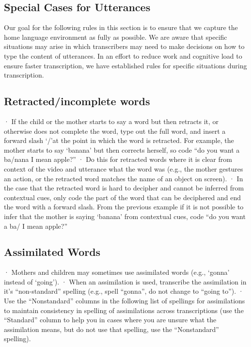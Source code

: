 \documentclass[
  12pt,
]{book}
\begin{document}
\hypertarget{special-cases-for-utterances}{%
\subsection{Special Cases for Utterances}\label{special-cases-for-utterances}}

Our goal for the following rules in this section is to ensure that we capture the home language environment as fully as possible. We are aware that specific situations may arise in which transcribers may need to make decisions on how to type the content of utterances. In an effort to reduce work and cognitive load to ensure faster transcription, we have established rules for specific situations during transcription.

\hypertarget{retractedincomplete-words}{%
\subsection{Retracted/incomplete words}\label{retractedincomplete-words}}

· If the child or the mother starts to say a word but then retracts it, or otherwise does not complete the word, type out the full word, and insert a forward slash `/'at the point in which the word is retracted. For example, the mother starts to say `banana' but then corrects herself, so code ``do you want a ba/nana I mean apple?''
· Do this for retracted words where it is clear from context of the video and utterance what the word was (e.g., the mother gestures an action, or the retracted word matches the name of an object on screen).
· In the case that the retracted word is hard to decipher and cannot be inferred from contextual cues, only code the part of the word that can be deciphered and end the word with a forward slash. From the previous example if it is not possible to infer that the mother is saying `banana' from contextual cues, code ``do you want a ba/ I mean apple?''

\hypertarget{assimilated-words}{%
\subsection{Assimilated Words}\label{assimilated-words}}

· Mothers and children may sometimes use assimilated words (e.g., `gonna' instead of `going').
· When an assimilation is used, transcribe the assimilation in it's ``non-standard'' spelling (e.g., spell ``gonna'', do not change to ``going to'').
· Use the ``Nonstandard'' columns in the following list of spellings for assimilations to maintain consistency in spelling of assimilations across transcriptions (use the ``Standard'' column to help you in cases where you are unsure what the assimilation means, but do not use that spelling, use the ``Nonstandard'' spelling).
\end{document}
